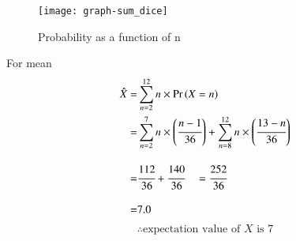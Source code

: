 \documentclass[journal,12pt,twocolumn]{IEEEtran}
\begin{document}
\begin{table}[b!]
    \caption{Probability as a function of n }
    \label{tab:probability_function}
\end{table}
\newpage
\begin{figure}[h]
    \centering
    \texttt{[image: graph-sum\_dice]}
    \caption{Probability as a function of n}
    \label{fig:fig_comp}
\end{figure}
For mean
\begin{align}
    \hat X =& \sum_{n=2}^{12}{n\times\Pr\left(X=n\right)}
    \\=& \sum_{n=2}^{7}{n\times \left(\cfrac{n-1}{36}\right)} + \sum_{n=8}^{12}{n\times \left(\cfrac{13-n}{36}\right)}
    \\[2ex]=& \cfrac{112}{36} + \cfrac{140}{36} \quad = \cfrac{252}{36}
    \\[2ex] =& 7.0
\end{align}
\[ \therefore \text{expectation value of } X \text{ is } 7  \]
\end{document}
